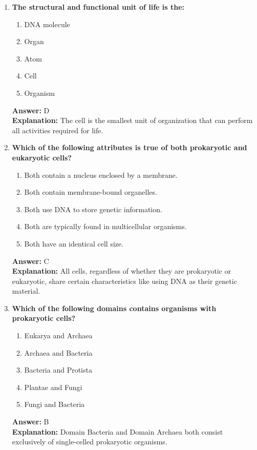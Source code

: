 \documentclass[11pt, a4paper]{article}
\begin{document}
\begin{enumerate}
\item \textbf{The structural and functional unit of life is the:}
\begin{enumerate}[label=\Alph*.]
    \item DNA molecule
    \item Organ
    \item Atom
    \item Cell
    \item Organism
\end{enumerate}
\textbf{Answer:} D \\
\textbf{Explanation:} The cell is the smallest unit of organization that can perform all activities required for life.

\item \textbf{Which of the following attributes is true of both prokaryotic and eukaryotic cells?}
\begin{enumerate}[label=\Alph*.]
    \item Both contain a nucleus enclosed by a membrane.
    \item Both contain membrane-bound organelles.
    \item Both use DNA to store genetic information.
    \item Both are typically found in multicellular organisms.
    \item Both have an identical cell size.
\end{enumerate}
\textbf{Answer:} C \\
\textbf{Explanation:} All cells, regardless of whether they are prokaryotic or eukaryotic, share certain characteristics like using DNA as their genetic material.

\item \textbf{Which of the following domains contains organisms with prokaryotic cells?}
\begin{enumerate}[label=\Alph*.]
    \item Eukarya and Archaea
    \item Archaea and Bacteria
    \item Bacteria and Protista
    \item Plantae and Fungi
    \item Fungi and Bacteria
\end{enumerate}
\textbf{Answer:} B \\
\textbf{Explanation:} Domain Bacteria and Domain Archaea both consist exclusively of single-celled prokaryotic organisms.


\end{enumerate}
\end{document}
